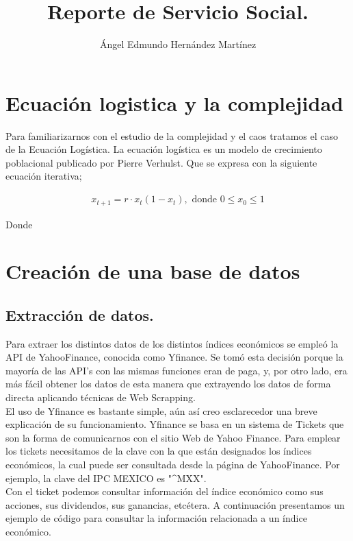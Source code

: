 \documentclass[10pt,a4paper]{article}
\author{Ángel Edmundo Hernández Martínez}
\title{Reporte de Servicio Social.}
\date{}
\begin{document}
\maketitle

\section{Ecuación logistica y la complejidad}

	Para familiarizarnos con el estudio de la complejidad y el caos tratamos el caso de la Ecuación Logística. 
	La ecuación logística es un modelo de crecimiento poblacional publicado por Pierre Verhulst. Que se expresa con la siguiente ecuación iterativa;
	
	\begin{align*}
	x_{t+1} =  r\cdot x_{t}(1 - x_t), \text{ donde } 0 \leq x_0 \leq 1 
	\end{align*}

	Donde 

\section{Creación de una base de datos}

	\subsection{Extracción de datos.}

		Para extraer los distintos datos de los distintos índices económicos se empleó la API de YahooFinance, conocida como Yfinance. Se tomó esta decisión porque la mayoría de las API's con las mismas funciones eran de paga, y, por otro lado, era más fácil obtener los datos de esta manera que extrayendo los datos de forma directa aplicando técnicas de Web Scrapping. \\
		
		El uso de Yfinance es bastante simple, aún así creo esclarecedor una breve explicación de su funcionamiento. Yfinance se basa en un sistema de Tickets que son la forma de comunicarnos con el sitio Web de Yahoo Finance. Para emplear los tickets necesitamos de la clave con la que están designados los índices económicos, la cual puede ser consultada desde la página de YahooFinance. Por ejemplo, la clave del IPC MEXICO es "\^{}MXX". \\
		
		Con el ticket podemos consultar información del índice económico como sus acciones, sus dividendos, sus ganancias, etcétera. A continuación presentamos un ejemplo de código para consultar la información relacionada a un índice económico. \\
		
\end{document}
